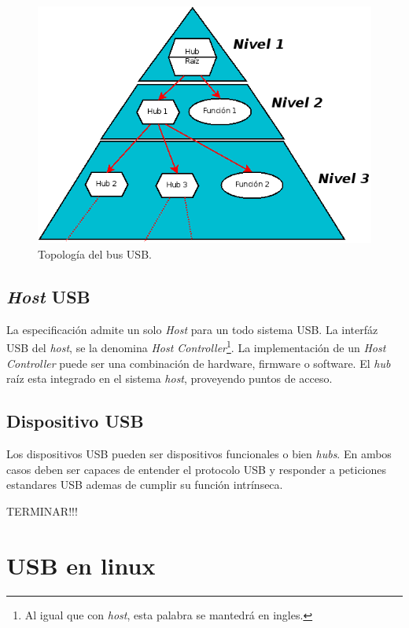 \begin{figure}
\centering
\includegraphics[scale=0.5]{./img/usb_topology.png}
\caption{Topolog\'ia del bus USB.}
\label{fig:usb_topology}
\end{figure}

\subsection{\emph{Host} USB}

La especificaci\'on admite un solo \emph{Host} para un todo sistema USB. La
interf\'az USB del \emph{host}, se la denomina \emph{Host
Controller}\footnote{Al igual que con \emph{host}, esta palabra se mantedr\'a
en ingles.}. La implementaci\'on de un \emph{Host Controller} puede ser una
combinaci\'on de hardware, firmware o software. El \emph{hub} ra\'iz esta
integrado en el sistema \emph{host}, proveyendo puntos de acceso.

\subsection{Dispositivo USB}

Los dispositivos USB pueden ser dispositivos funcionales o bien \emph{hubs}.
En ambos casos deben ser capaces de entender el protocolo USB y responder a
peticiones estandares USB ademas de cumplir su funci\'on intr\'inseca. 

\begin{Huge} TERMINAR!!! \end{Huge}


\section{USB en linux}

